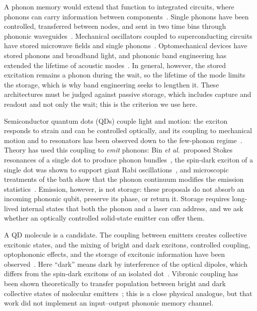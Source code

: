 \documentclass[aps,pra,preprint,groupedaddress,amsmath,amssymb,floatfix]{revtex4-2}
\begin{document}
A phonon memory would extend that function to integrated circuits, where phonons can carry information between components~\cite{habraken2012,schuetz2015}. Single phonons have been controlled, transferred between nodes, and sent in two time bins through phononic waveguides~\cite{satzinger2018,bienfait2019,dumur2021,zivariWaveguide2022,zivariTimebin2022}. Mechanical oscillators coupled to superconducting circuits have stored microwave fields and single phonons~\cite{oconnell2010,chu2017,palomaki2013,liu2023,reed2017}. Optomechanical devices have stored phonons and broadband light, and phononic band engineering has extended the lifetime of acoustic modes~\cite{galland2014,wallucks2020,england2013,macCabe2020,taylor2022,bozkurt2025}. In general, however, the stored excitation remains a phonon during the wait, so the lifetime of the mode limits the storage, which is why band engineering seeks to lengthen it. These architectures must be judged against passive storage, which includes capture and readout and not only the wait; this is the criterion we use here.

Semiconductor quantum dots (QDs) couple light and motion: the exciton responds to strain and can be controlled optically, and its coupling to mechanical motion and to resonators has been observed down to the few-phonon regime~\cite{kettler2021,spinnler2024}. Theory has used this coupling to \emph{emit} phonons: Bin \emph{et al.}\ proposed Stokes resonances of a single dot to produce phonon bundles~\cite{bin2020}, the spin-dark exciton of a single dot was shown to support giant Rabi oscillations~\cite{vargas2022}, and microscopic treatments of the bath show that the phonon continuum modifies the emission statistics~\cite{cosacchi2022}. Emission, however, is not storage: these proposals do not absorb an incoming phononic qubit, preserve its phase, or return it. Storage requires long-lived internal states that both the phonon and a laser can address, and we ask whether an optically controlled solid-state emitter can offer them.

A QD molecule is a candidate. The coupling between emitters creates collective excitonic states, and the mixing of bright and dark excitons, controlled coupling, optophononic effects, and the storage of excitonic information have been observed~\cite{ortner2003,krenner2005,gerardot2005,skold2013,kerfoot2014,boyerdelagiroday2011,carlson2019}. Here ``dark'' means dark by interference of the optical dipoles, which differs from the spin-dark excitons of an isolated dot~\cite{lueker2017}. Vibronic coupling has been shown theoretically to transfer population between bright and dark collective states of molecular emitters~\cite{holzinger2022}; this is a close physical analogue, but that work did not implement an input--output phononic memory channel.
\end{document}
